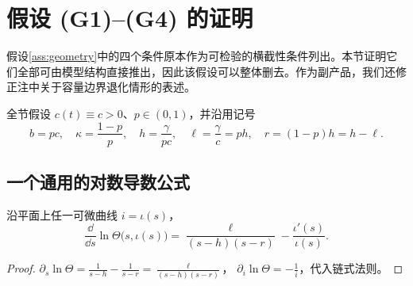 %
%
%
%

\section{假设 (G1)--(G4) 的证明}
\label{sec:assumptions-proved}

假设\ref{ass:geometry}中的四个条件原本作为可检验的横截性条件列出。本节证明它们全部可由模型结构直接推出，因此该假设可以整体删去。作为副产品，我们还修正注中关于容量边界退化情形的表述。

全节假设 $c(t)\equiv c>0$、$p\in(0,1)$，并沿用记号
\[
b=pc,\quad \kappa=\frac{1-p}{p},\quad h=\frac{\gamma}{pc},\quad \ell=\frac\gamma c=ph,\quad r=(1-p)h=h-\ell .
\]

\subsection{一个通用的对数导数公式}

\begin{lemma}
\label{lem:logderiv}
沿平面上任一可微曲线 $i=\iota(s)$，
\begin{equation}
\frac{\dd}{\dd s}\ln\Theta\bigl(s,\iota(s)\bigr)
=\frac{\ell}{(s-h)(s-r)}-\frac{\iota'(s)}{\iota(s)} .
\label{eq:general-logderiv}
\end{equation}
\end{lemma}

\begin{proof}
$\partial_s\ln\Theta=\frac1{s-h}-\frac1{s-r}=\frac{\ell}{(s-h)(s-r)}$，
$\partial_i\ln\Theta=-\frac1i$，代入链式法则。
\end{proof}

